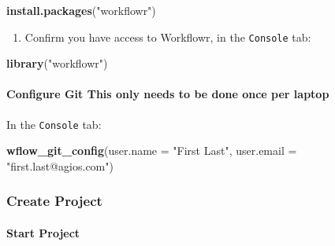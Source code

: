 \documentclass[openany]{article}
\newenvironment{Shaded}{\begin{snugshade}}{\end{snugshade}}
\newcommand{\DataTypeTok}[1]{\textcolor[rgb]{0.13,0.29,0.53}{#1}}
\newcommand{\KeywordTok}[1]{\textcolor[rgb]{0.13,0.29,0.53}{\textbf{#1}}}
\newcommand{\NormalTok}[1]{#1}
\newcommand{\StringTok}[1]{\textcolor[rgb]{0.31,0.60,0.02}{#1}}
\providecommand{\tightlist}{%
  \setlength{\itemsep}{0pt}\setlength{\parskip}{0pt}}
\let\oldparagraph\paragraph
\renewcommand{\paragraph}[1]{\oldparagraph{#1}\mbox{}}
\begin{document}
\begin{Shaded}
\begin{Highlighting}[]
\KeywordTok{install.packages}\NormalTok{(}\StringTok{"workflowr"}\NormalTok{)}
\end{Highlighting}
\end{Shaded}

\begin{enumerate}
\def\labelenumi{\arabic{enumi}.}
\setcounter{enumi}{2}
\tightlist
\item
  Confirm you have access to Workflowr, in the \texttt{Console} tab:
\end{enumerate}

\begin{Shaded}
\begin{Highlighting}[]
\KeywordTok{library}\NormalTok{(}\StringTok{"workflowr"}\NormalTok{)}
\end{Highlighting}
\end{Shaded}

\hypertarget{configure-git-this-only-needs-to-be-done-once-per-laptop}{%
\paragraph{\texorpdfstring{Configure Git\emph{
}This only needs to be done once per laptop}{Configure Git This only needs to be done once per laptop}}\label{configure-git-this-only-needs-to-be-done-once-per-laptop}}

In the \texttt{Console} tab:

\begin{Shaded}
\begin{Highlighting}[]
\KeywordTok{wflow_git_config}\NormalTok{(}\DataTypeTok{user.name =} \StringTok{"First Last"}\NormalTok{, }
    \DataTypeTok{user.email =} \StringTok{"first.last@agios.com"}\NormalTok{)}
\end{Highlighting}
\end{Shaded}

\hypertarget{create-project}{%
\subsubsection{Create Project}\label{create-project}}

\hypertarget{start-project}{%
\paragraph{Start Project}\label{start-project}}
\end{document}
